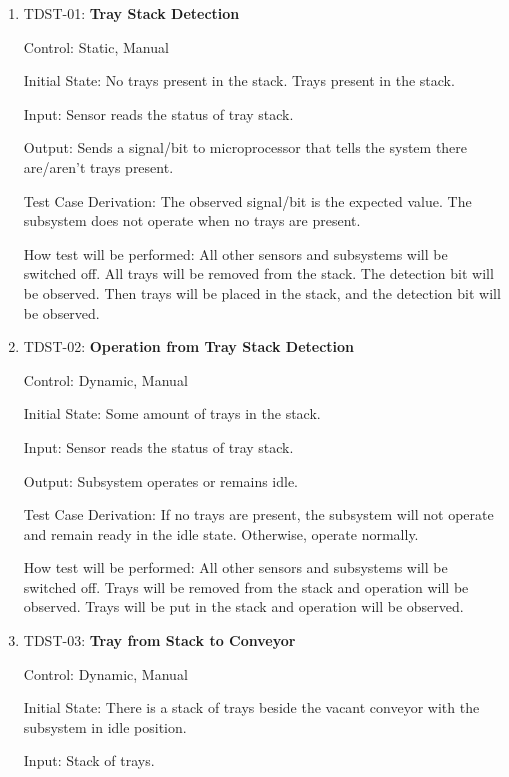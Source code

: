 \documentclass[12pt, titlepage]{article}
\begin{document}
\begin{enumerate}
        
  \item{TDST-01: \textbf{Tray Stack Detection}}
  
  Control: Static, Manual
            
  Initial State: No trays present in the stack. Trays present in the stack.
            
  Input: Sensor reads the status of tray stack.
            
  Output: Sends a signal/bit to microprocessor that tells the system there are/aren't trays present.
   
  
  Test Case Derivation: The observed signal/bit is the expected value. The subsystem does not operate when no trays are present.
  
  How test will be performed: All other sensors and subsystems will be switched off. 
  All trays will be removed from the stack. The detection bit will be observed. 
  Then trays will be placed in the stack, and the detection bit will be observed.
\\
  \item{TDST-02: \textbf{Operation from Tray Stack Detection}}
  
  Control: Dynamic, Manual
            
  Initial State: Some amount of trays in the stack.
            
  Input: Sensor reads the status of tray stack.
            
  Output: Subsystem operates or remains idle.
  
  Test Case Derivation: If no trays are present, the subsystem will not operate 
  and remain ready in the idle state. Otherwise, operate normally.
  
  How test will be performed: All other sensors and subsystems will be switched off. 
  Trays will be removed from the stack and operation will be observed. Trays will be 
  put in the stack and operation will be observed.\\

  \item{TDST-03: \textbf{Tray from Stack to Conveyor}}
  
  Control: Dynamic, Manual
            
  Initial State: There is a stack of trays beside the vacant conveyor with the subsystem in idle position.
            
  Input: Stack of trays.
            

\end{enumerate}
\end{document}
